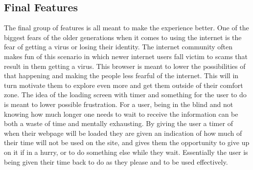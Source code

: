 \documentclass[11pt]{article}
\begin{document}
\subsection{Final Features}
The final group of features is all meant to make the experience better. One of the biggest fears of the older generations when it comes to using the internet is the fear of getting a virus or losing their identity. The internet community often makes fun of this scenario in which newer internet users fall victim to scams that result in them getting a virus. This browser is meant to lower the possibilities of that happening and making the people less fearful of the internet. This will in turn motivate them to explore even more and get them outside of their comfort zone. The idea of the loading screen with timer and something for the user to do is meant to lower possible frustration. For a user, being in the blind and not knowing how much longer one needs to wait to receive the information can be both a waste of time and mentally exhausting. By giving the user a timer of when their webpage will be loaded they are given an indication of how much of their time will not be used on the site, and gives them the opportunity to give up on it if in a hurry, or to do something else while they wait. Essentially the user is being given their time back to do as they please and to be used effectively.
\end{document}
